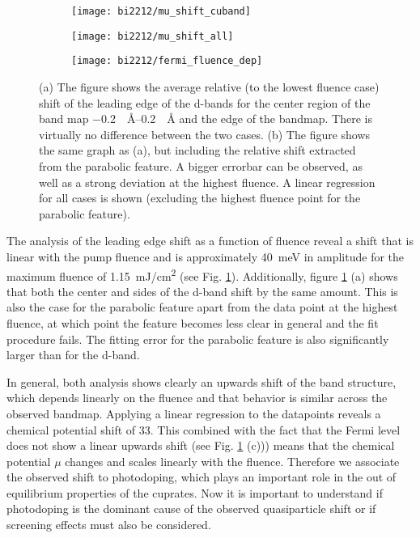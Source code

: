 \begin{figure}[b!]
	\centering
	\begin{subfigure}[b]{0.33\textwidth}
		\texttt{[image: bi2212/mu\_shift\_cuband]}
		\caption{}
	\end{subfigure}
	\begin{subfigure}[b]{0.33\textwidth}
		\texttt{[image: bi2212/mu\_shift\_all]}
		\caption{}
	\end{subfigure}
	\begin{subfigure}[b]{0.33\textwidth}
		\texttt{[image: bi2212/fermi\_fluence\_dep]}
		\caption{}
	\end{subfigure}
	\caption{(a) The figure shows the average relative (to the lowest fluence case) shift of the leading edge of the  d-bands for the center region of the band map \qtyrange{-0.2}{0.2}{\per\angstrom} and the edge of the bandmap. There is virtually no difference between the two cases. (b) The figure shows the same graph as (a), but including the relative shift extracted from the parabolic feature. A bigger errorbar can be observed, as well as a strong deviation at the highest fluence. A linear regression for all cases is shown (excluding the highest fluence point for the parabolic feature).}
	\label{fig:mu_shift}
\end{figure}

The analysis of the leading edge shift as a function of fluence reveal a shift that is linear with the pump fluence and is approximately \qty{40}{\milli\electronvolt} in amplitude for the maximum fluence of \qty{1.15}{\milli\joule/\centi\meter\squared} (see Fig. \ref{fig:mu_shift}).
Additionally, figure \ref{fig:mu_shift} (a) shows that both the center and sides of the  d-band shift by the same amount.
This is also the case for the parabolic feature apart from the data point at the highest fluence, at which point the feature becomes less clear in general and the fit procedure fails.
The fitting error for the parabolic feature is also significantly larger than for the  d-band.

In general, both analysis shows clearly an upwards shift of the band structure, which depends linearly on the fluence and that behavior is similar across the observed bandmap.
Applying a linear regression to the datapoints reveals a chemical potential shift of \qty{33}{\frac{\milli\electronvolt}{\milli\joule/\centi\meter\squared}}.
This combined with the fact that the Fermi level does not show a linear upwards shift (see Fig. \ref{fig:mu_shift} (c))) means that the chemical potential $\mu$ changes and scales linearly with the fluence.
Therefore we associate the observed shift to photodoping, which plays an important role in the out of equilibrium properties of the cuprates.
Now it is important to understand if photodoping is the dominant cause of the observed quasiparticle shift or if screening effects must also be considered.

